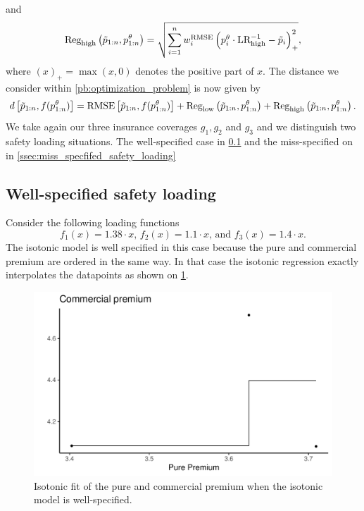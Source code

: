 \documentclass[10pt]{article}
\begin{document}
and 
\begin{equation*}\label{eq:LR_bounds2}
\text{Reg}_{\text{high}}\left(\Tilde{p}_{1:n}, p_{1:n}^\theta\right) = \sqrt{\sum_{i=1}^nw_i^{\text{RMSE}}\left(p_i^\theta \cdot \text{LR}_{\text{high}}^{-1} - \Tilde{p}_i\right)_+^2},
\end{equation*}
where \((x)_+ = \max(x,0)\) denotes the positive part of \(x\). The distance we consider within \cref{pb:optimization_problem} is now given by 
\[
d\left[\Tilde{p}_{1:n}, f(p_{1:n}^\theta)\right] = \text{RMSE}\left[\Tilde{p}_{1:n}, f(p_{1:n}^\theta)\right] + \text{Reg}_{\text{low}}\left(\Tilde{p}_{1:n}, p_{1:n}^\theta\right) + \text{Reg}_{\text{high}}\left(\Tilde{p}_{1:n}, p_{1:n}^\theta\right).
\]
We take again our three insurance coverages $g_1, g_2$ and $g_3$ and we distinguish two safety loading situations. The well-specified case in \cref{ssec:well_specfifed_safety_loading} and the miss-specified on in \cref{ssec:miss_specfifed_safety_loading}
\subsection{Well-specified safety loading}\label{ssec:well_specfifed_safety_loading}
Consider the following loading functions
$$
f_1(x) = 1.38\cdot x\text{, }f_2(x) = 1.1\cdot x \text{, and } f_3(x) = 1.4\cdot x. 
$$
The isotonic model is well specified in this case because the pure and commercial premium are ordered in the same way. In that case the isotonic regression exactly interpolates the datapoints as shown on \cref{fig:pp_cp_well_specified}.

\begin{figure}[!ht]
  \begin{center}
  \includegraphics[width=0.7\linewidth]{../figures/pp_cp_well_specified}
    \caption{Isotonic fit of the pure and commercial premium when the isotonic model is well-specified.}
    \label{fig:pp_cp_well_specified}
  \end{center}
\end{figure}
\end{document}
